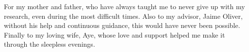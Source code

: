 For my mother and father, who have always taught me to never give up with my research, even during the most difficult times. Also to my advisor, Jaime Oliver, without his help and continuous guidance, this would have never been possible. Finally to my loving wife, Aye, whose love and support helped me make it through the sleepless evenings.